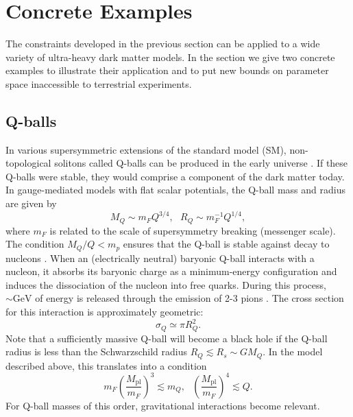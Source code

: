 \documentclass[twocolumn,showpacs,preprintnumbers,amsmath,amssymb,prd]{revtex4}
\newcommand{\Mpl}{M_{\text{pl}}}
\def\r{\right)}
\def\l{\left(}
\begin{document}
\section{Concrete Examples}
\label{sec:ConcreteExamples}

The constraints developed in the previous section can be applied to a wide variety of ultra-heavy dark matter models. In the section we give two concrete examples to illustrate their application and to put new bounds on parameter space inaccessible to terrestrial experiments.

\subsection{Q-balls}
\label{sec:Qballs}
In various supersymmetric extensions of the standard model (SM), non-topological solitons called Q-balls can be produced in the early universe \cite{Coleman:1985ki, Kusenko:1997si}. If these Q-balls were stable, they would comprise a component of the dark matter today. In gauge-mediated models with flat scalar potentials, the Q-ball mass and radius are given by
\begin{equation}
\label{eq:Qballprop}
M_Q \sim m_F Q^{3/4}, ~~~ R_Q \sim m_F^{-1} Q^{1/4},
\end{equation}
where $m_F$ is related to the scale of supersymmetry breaking (messenger scale). The condition $M_Q/Q < m_p$ ensures that the Q-ball is stable against decay to nucleons \cite{Dine:2003ax}. When an (electrically neutral) baryonic Q-ball interacts with a nucleon, it absorbs its baryonic charge as a minimum-energy configuration and induces the dissociation of the nucleon into free quarks. During this process, $\sim \text{GeV}$ of energy is released through the emission of 2-3 pions \cite{Dine:2003ax}. The cross section for this interaction is approximately geometric:
\begin{equation}
\sigma_Q \simeq \pi R_Q^2.
\end{equation}
Note that a sufficiently massive Q-ball will become a black hole if the Q-ball radius is less than the Schwarzschild radius $R_Q \lesssim R_s \sim G M_Q$. In the model described above, this translates into a condition
\begin{equation}
m_F \l\frac{\Mpl}{m_F}\r^3 \lesssim m_Q, ~~~ \l\frac{\Mpl}{m_F}\r^4 \lesssim Q.
\end{equation}
For Q-ball masses of this order, gravitational interactions become relevant.
\end{document}
